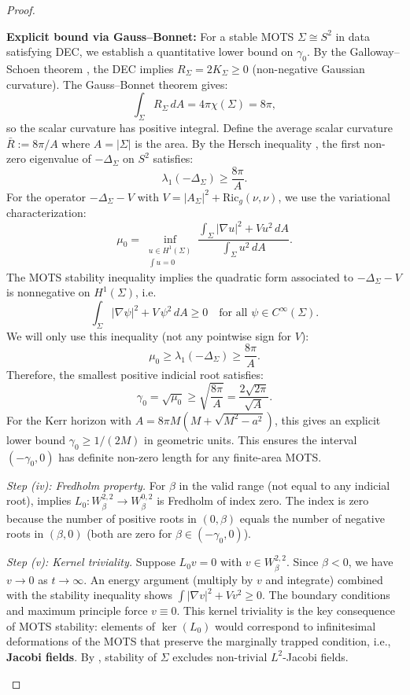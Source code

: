 \documentclass[12pt]{article}
\theoremstyle{plain}
\theoremstyle{definition}
\theoremstyle{remark}
\newcommand{\Ric}{\mathrm{Ric}}
\begin{document}
\begin{proof}
\begin{itemize}
    \textbf{Explicit bound via Gauss--Bonnet:} For a stable MOTS $\Sigma \cong S^2$ in data satisfying DEC, we establish a quantitative lower bound on $\gamma_0$. By the Galloway--Schoen theorem \cite{gallowayschoen2006}, the DEC implies $R_\Sigma = 2K_\Sigma \geq 0$ (non-negative Gaussian curvature). The Gauss--Bonnet theorem gives:
    \[
    \int_\Sigma R_\Sigma \, dA = 4\pi \chi(\Sigma) = 8\pi,
    \]
    so the scalar curvature has positive integral. Define the average scalar curvature $\bar{R} := 8\pi/A$ where $A = |\Sigma|$ is the area. By the Hersch inequality \cite{hersch1970}, the first non-zero eigenvalue of $-\Delta_\Sigma$ on $S^2$ satisfies:
    \[
    \lambda_1(-\Delta_\Sigma) \geq \frac{8\pi}{A}.
    \]
    For the operator $-\Delta_\Sigma - V$ with $V = |A_\Sigma|^2 + \Ric_g(\nu,\nu)$, we use the variational characterization:
    \[
    \mu_0 = \inf_{\substack{u \in H^1(\Sigma) \\ \int u = 0}} \frac{\int_\Sigma |\nabla u|^2 + V u^2 \, dA}{\int_\Sigma u^2 \, dA}.
    \]
    The MOTS stability inequality implies the quadratic form associated to $-\Delta_\Sigma - V$ is nonnegative on $H^1(\Sigma)$, i.e.
    \[
    \int_\Sigma |\nabla \psi|^2 + V\,\psi^2\, dA \ge 0 \quad \text{for all } \psi \in C^\infty(\Sigma).
    \]
    We will only use this inequality (not any pointwise sign for $V$):
    \[
    \mu_0 \geq \lambda_1(-\Delta_\Sigma) \geq \frac{8\pi}{A}.
    \]
    Therefore, the smallest positive indicial root satisfies:
    \[
    \gamma_0 = \sqrt{\mu_0} \geq \sqrt{\frac{8\pi}{A}} = \frac{2\sqrt{2\pi}}{\sqrt{A}}.
    \]
    For the Kerr horizon with $A = 8\pi M(M + \sqrt{M^2 - a^2})$, this gives an explicit lower bound $\gamma_0 \geq 1/(2M)$ in geometric units. This ensures the interval $(-\gamma_0, 0)$ has definite non-zero length for any finite-area MOTS.
    
    \textit{Step (iv): Fredholm property.} For $\beta$ in the valid range (not equal to any indicial root), \cite[Theorem 1.1]{lockhartmccowen1985} implies $L_0: W^{2,2}_\beta \to W^{0,2}_\beta$ is Fredholm of index zero. The index is zero because the number of positive roots in $(0, \beta)$ equals the number of negative roots in $(\beta, 0)$ (both are zero for $\beta \in (-\gamma_0, 0)$).
    
    \textit{Step (v): Kernel triviality.} Suppose $L_0 v = 0$ with $v \in W^{2,2}_\beta$. Since $\beta < 0$, we have $v \to 0$ as $t \to \infty$. An energy argument (multiply by $v$ and integrate) combined with the stability inequality shows $\int |\nabla v|^2 + V v^2 \geq 0$. The boundary conditions and maximum principle force $v \equiv 0$. This kernel triviality is the key consequence of MOTS stability: elements of $\ker(L_0)$ would correspond to infinitesimal deformations of the MOTS that preserve the marginally trapped condition, i.e., \textbf{Jacobi fields}. By \cite[Proposition 3.2]{anderssonmetzger2009}, stability of $\Sigma$ excludes non-trivial $L^2$-Jacobi fields.
    

\end{itemize}
\end{proof}
\end{document}
